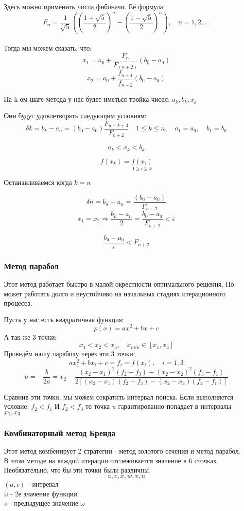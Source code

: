 \documentclass[fleqn]{article}
\begin{document}
Здесь можно применить числа фибоначи. Её формула:
$$F_n = \frac{1}{\sqrt{5}}((\frac{1+\sqrt{5}}{2})^n-(\frac{1-\sqrt{5}}{2})^n),\quad n=1,2,\dots$$\\

Тогда мы можем сказать, что:\\

$$x_1=a_0+\frac{F_n}{F_(n+2)}(b_0-a_0)$$
$$x_2=a_0+\frac{f_{n+1}}{f_{n+2}}(b_0-a_0)$$

На k-ом шаге метода у нас будет иметься тройка чисел: $a_k, b_k, x_k$

Они будут удовлетворять следующим условиям:
$$\delta k = b_k - a_n = (b_0-a_0)\frac{F_{n-k+3}}{F_{n+2}} \quad 1 \leq k \leq n,\quad a_1 = a_0,\quad b_1=b_0$$

$$a_k < x_k < b_k$$

$$f(x_k)=\underset{1 \geq i \geq k}{f(x_i)}$$

Останавливаемся когда $k=n$

$$\delta n = b_n - a_n = \frac{(b_0-a_0)}{F_{n+2}}$$
$$x_1 = x_2 \Rightarrow \frac{b_n - a_n}{2} = \frac{b_0-a_0}{F_{n+2}}<\varepsilon$$

$$\frac{b_0-a_0}{\varepsilon}<F_{n+2}$$

\subsubsection{Метод парабол}
Этот метод работает быстро в малой окрестности оптимального решения. Но может работать долго и неустойчиво на начальных стадиях итерационного процесса.

Пусть у нас есть квадратичная функция:
$$p(x)=ax^2+bx+c$$
А так же 3 точки:
$$x_1 < x_2 < x_3,\quad x_{min}\in[x_1,x_3]$$
Проведём нашу параболу через эти 3 точки:
$$ax^2_1+bx_i+c=f_i=f(x_i),\quad i=\overline{1,3}$$
$$u=-\frac{b}{2a}=x_2-\frac{(x_2-x_1)^2(f_2-f_3)-(x_2-x_2)^2(f_3-f_1)}{2[(x_2-x_1)(f_2-f_3)-(x_2-x_3)(f_2-f_1)]}$$

Сравнив эти точки, мы можем сократить интервал поиска. Если выполняется условие: $f_2<f_1$ И $f_2<f_3$ то точка $u$ гарантированно попадает в интервалы $x_1,\space x_3$

\subsubsection{Комбинаторный метод Бренда}
Этот метод комбенирует 2 стратегии - метод золотого сечения и метод парабол.\\

В этом методе на каждой итерации отслеживается значение в 6 сточках. Необязательно, что бы эти точки были различны.
$$a, c, x, w, v, u$$
$(a,c)$ - интревал\\
$\omega$ - 2е значение функции\\
$v$ - предыдущее значение $\omega$\\
\end{document}
